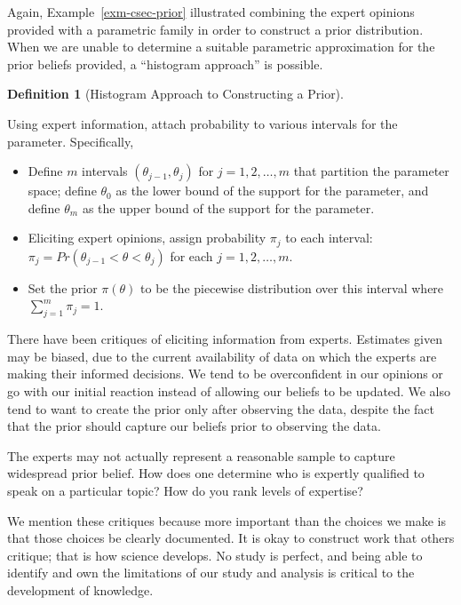 \documentclass[
  letterpaper,
  DIV=11,
  numbers=noendperiod]{scrreprt}
\providecommand{\tightlist}{%
  \setlength{\itemsep}{0pt}\setlength{\parskip}{0pt}}\usepackage{longtable,booktabs,array}
\theoremstyle{definition}
\newtheorem{definition}{Definition}[chapter]
\theoremstyle{plain}
\theoremstyle{definition}
\theoremstyle{remark}
\begin{document}
Again, Example~\ref{exm-csec-prior} illustrated combining the expert
opinions provided with a parametric family in order to construct a prior
distribution. When we are unable to determine a suitable parametric
approximation for the prior beliefs provided, a ``histogram approach''
is possible.

\begin{definition}[Histogram Approach to Constructing a
Prior]\protect\hypertarget{def-histogram-prior}{}\label{def-histogram-prior}

Using expert information, attach probability to various intervals for
the parameter. Specifically,

\begin{itemize}
\tightlist
\item
  Define \(m\) intervals \(\left(\theta_{j-1}, \theta_j\right)\) for
  \(j = 1, 2, \dotsc, m\) that partition the parameter space; define
  \(\theta_0\) as the lower bound of the support for the parameter, and
  define \(\theta_m\) as the upper bound of the support for the
  parameter.
\item
  Eliciting expert opinions, assign probability \(\pi_j\) to each
  interval: \(\pi_j = Pr\left(\theta_{j-1} < \theta < \theta_j\right)\)
  for each \(j = 1, 2, \dotsc, m\).
\item
  Set the prior \(\pi(\theta)\) to be the piecewise distribution over
  this interval where \(\sum_{j=1}^{m} \pi_j = 1\).
\end{itemize}

\end{definition}

There have been critiques of eliciting information from experts.
Estimates given may be biased, due to the current availability of data
on which the experts are making their informed decisions. We tend to be
overconfident in our opinions or go with our initial reaction instead of
allowing our beliefs to be updated. We also tend to want to create the
prior only after observing the data, despite the fact that the prior
should capture our beliefs prior to observing the data.

The experts may not actually represent a reasonable sample to capture
widespread prior belief. How does one determine who is expertly
qualified to speak on a particular topic? How do you rank levels of
expertise?

We mention these critiques because more important than the choices we
make is that those choices be clearly documented. It is okay to
construct work that others critique; that is how science develops. No
study is perfect, and being able to identify and own the limitations of
our study and analysis is critical to the development of knowledge.
\end{document}
